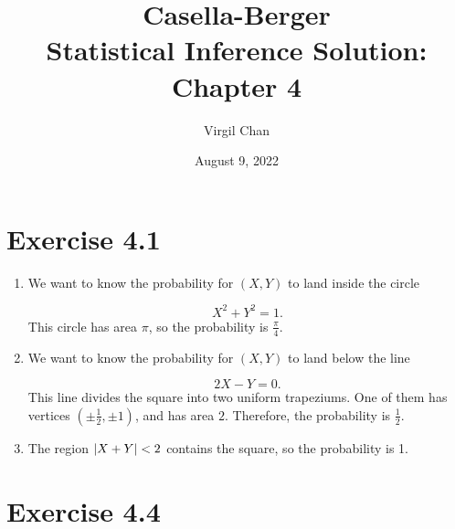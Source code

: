 \documentclass[12pt,letterpaper,reqno]{amsart}
\author{Virgil Chan}
\title{Casella-Berger \\ Statistical Inference Solution: \\ Chapter 4}
\date{August 9, 2022}
\numberwithin{equation}{subsection}
\begin{document}
\maketitle

\tableofcontents

\newpage
\section{Exercise 4.1}

\begin{enumerate}[label=(\alph*),leftmargin=*]
    \item We want to know the probability for $(X,Y)$ to land inside the circle
    
    \[ X^2 + Y^2 = 1. \]
    This circle has area $\pi$, so the probability is $\frac{\pi}{4}$.
    
    \item We want to know the probability for $(X,Y)$ to land below the line
    
    \[ 2X-Y = 0. \]
    This line divides the square into two uniform trapeziums. One of them has vertices $\left( \pm \frac{1}{2}, \pm 1 \right)$, and has area $2$. Therefore, the probability is $\frac{1}{2}.$
    
    \item The region $\left\lvert{X+Y}\right\rvert < 2$ contains the square, so the probability is 1.
\end{enumerate}

\newpage
\section{Exercise 4.4}
\end{document}
